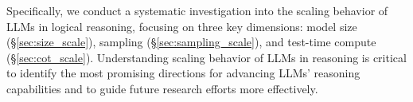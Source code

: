 Specifically, we conduct a systematic investigation into the scaling behavior of LLMs in logical reasoning, focusing on three key dimensions: model size (\S\ref{sec:size_scale}), sampling (\S\ref{sec:sampling_scale}), and test-time compute (\S\ref{sec:cot_scale}).
Understanding scaling behavior of LLMs in reasoning is critical to identify the most promising directions for advancing LLMs' reasoning capabilities and to guide future research efforts more effectively.



